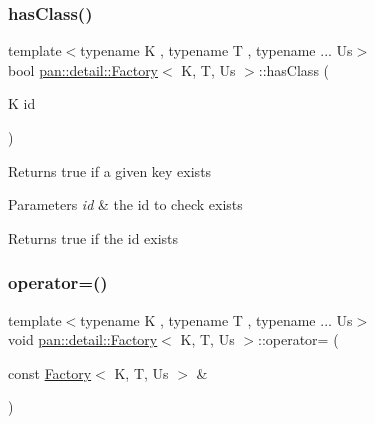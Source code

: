 \subsubsection{\texorpdfstring{has\+Class()}{hasClass()}}
{\footnotesize\ttfamily template$<$typename K , typename T , typename ... Us$>$ \\
bool \hyperlink{classpan_1_1detail_1_1_factory}{pan\+::detail\+::\+Factory}$<$ K, T, Us $>$\+::has\+Class (\begin{DoxyParamCaption}\item[{K}]{id }\end{DoxyParamCaption})\hspace{0.3cm}{\ttfamily [inline]}}

Returns true if a given key exists 
\begin{DoxyParams}{Parameters}
{\em id} & the id to check exists \\
\hline
\end{DoxyParams}
\begin{DoxyReturn}{Returns}
true if the id exists 
\end{DoxyReturn}
\mbox{\label{classpan_1_1detail_1_1_factory_a4ef5146a216ceade5b8c0b06bab2a38c}} 
\subsubsection{\texorpdfstring{operator=()}{operator=()}}
{\footnotesize\ttfamily template$<$typename K , typename T , typename ... Us$>$ \\
void \hyperlink{classpan_1_1detail_1_1_factory}{pan\+::detail\+::\+Factory}$<$ K, T, Us $>$\+::operator= (\begin{DoxyParamCaption}\item[{const \hyperlink{classpan_1_1detail_1_1_factory}{Factory}$<$ K, T, Us $>$ \&}]{ }\end{DoxyParamCaption})\hspace{0.3cm}{\ttfamily [delete]}}

\mbox{\label{classpan_1_1detail_1_1_factory_a1618a041575a6f490a327c5ee5b0cefc}} 
